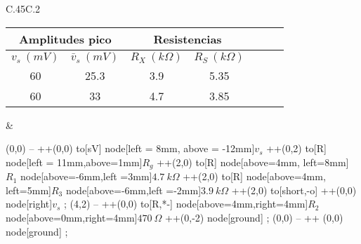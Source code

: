 \documentclass[a4paper, 10pt, spanish]{article}
\numberwithin{equation}{section}
\numberwithin{table}{section}
\begin{document}
\begin{flushleft}
 \begin{tabular}{C{.45\textwidth}C{.2\textwidth}} %
%
    {\normalsize
    \begin{tabular}{|c|c|c|c|c|c|c|}
    \hline
    \multicolumn{2}{|c|}{Amplitudes pico}           & \multicolumn{2}{|c|}{Resistencias}               \\ \hline
    $v_s\ (mV)$          & $\bar v_s\ (mV)$         & $R_X\ (k\Omega)$       & $R_S\ (k\Omega)$        \\ \hline
    60                   &     25.3                 & 3.9                    & 5.35                    \\ 
    60                   &     33                   & 4.7                    & 3.85                    \\  
    \hline
    \end{tabular}
    }\par%
  &
  \begin{circuitikz}[scale=0.8]
                                            \draw
                                            (0,0) -- ++(0,0) to[sV] node[left = 8mm, above = -12mm]{$v_s$} ++(0,2) to[R] node[left = 11mm,above=1mm]{$R_{g}$} ++(2,0) to[R] node[above=4mm, left=8mm]{$R_1$} node[above=-6mm,left =3mm]{$4.7\ k\Omega$} ++(2,0) to[R] node[above=4mm, left=5mm]{$R_3$} node[above=-6mm,left =-2mm]{$3.9\ k\Omega$} ++(2,0) to[short,-o] ++(0,0) node[right]{$v_s$}
                                            ;
                                            \draw
                                            (4,2) -- ++(0,0) to[R,*-] node[above=4mm,right=4mm]{$R_2$} node[above=0mm,right=4mm]{$470\ \Omega$} ++(0,-2) node[ground]
                                            ;
                                            \draw
                                            (0,0) -- ++ (0,0) node[ground]
                                            ;
  \end{circuitikz}\par
%
\end{tabular}
\end{flushleft}
\end{document}
